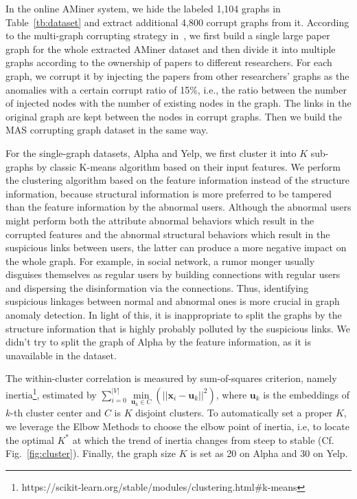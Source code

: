 In the online AMiner system, we hide the labeled 1,104 graphs in Table~\ref{tb:dataset} and extract additional 4,800 corrupt graphs from it. According to the multi-graph corrupting strategy in~, we first build a single large paper graph for the whole extracted AMiner dataset and then divide it into multiple graphs according to the ownership of papers to different researchers. For each graph, we corrupt it by injecting the papers from other researchers' graphs as the anomalies with a certain corrupt ratio of 15\%, i.e., the ratio between the number of injected nodes with the number of existing nodes in the graph. The links in the original graph are kept between the nodes in corrupt graphs. Then we build the MAS corrupting graph dataset in the same way.

For the single-graph datasets, Alpha and Yelp, we first cluster it into $K$ sub-graphs by classic K-means algorithm based on their input features. 
We perform the clustering algorithm based on the feature information instead of the structure information, because structural information is more preferred to be tampered than the feature information by the abnormal users. Although the abnormal users might perform both the attribute abnormal behaviors which result in the corrupted features and the abnormal structural behaviors which result in the suspicious links between users, the latter can produce a more negative impact on the whole graph. For example, in social network, a rumor monger usually disguises themselves as regular users by building connections with regular users and dispersing the disinformation via the connections. Thus, identifying suspicious linkages between normal and abnormal ones is more crucial in graph anomaly detection. In light of this, it is inappropriate to split the graphs by the structure information that is highly probably polluted by the suspicious links. We didn’t try to split the graph of Alpha by the feature information, as it is unavailable in the dataset.

The within-cluster correlation is measured by sum-of-squares criterion, namely inertia\footnote{https://scikit-learn.org/stable/modules/clustering.html\#k-means}, estimated by $\sum_{i=0}^{|V|}\min\limits_{\boldsymbol{u}_k\in C}\left(||\boldsymbol{x}_i - \boldsymbol{u}_k||^2\right)$, where $\boldsymbol{u}_k$ is the embeddings of $k$-th cluster center and $C$ is $K$ disjoint clusters. To automatically set a proper $K$, we leverage the Elbow Methods to choose the elbow point of inertia, i.e, to locate the optimal $K^*$ at which the trend of inertia changes from steep to stable (Cf. Fig.~\ref{fig:cluster}). Finally, the graph size $K$ is set as 20 on Alpha and 30 on Yelp.  

